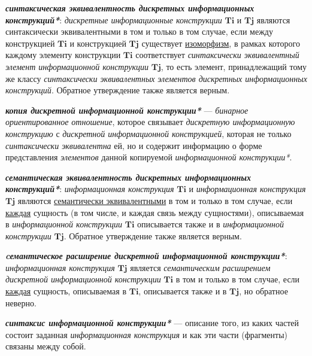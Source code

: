 \textit{\textbf{синтаксическая эквивалентность дискретных информационных конструкций*}}: \textit{дискретные информационные конструкции} $\bm{Ti}$ и $\bm{Tj}$ являются синтаксически эквивалентными в том и только в том случае, если между конструкцией \textit{$\bm{Ti}$} и конструкцией \textit{$\bm{Tj}$} существует \underline{изоморфизм}, в рамках которого каждому элементу конструкции \textit{$\bm{Ti}$} соответствует \textit{синтаксически эквивалентный элемент информационной конструкции} \textit{$\bm{Tj}$}, то есть элемент, принадлежащий тому же классу \textit{синтаксически эквивалентных} \textit{элементов дискретных информационных конструкций}.
Обратное утверждение также является верным.

\textit{\textbf{копия дискретной информационной конструкции*}} --- \textit{бинарное ориентированное отношение}, которое связывает \textit{дискретную информационную конструкцию} с \textit{дискретной информационной конструкцией}, которая не только \textit{синтаксически эквивалентна} ей, но и содержит информацию о форме представления \textit{элементов} данной копируемой \textit{информационной конструкции*}.

\begin{SCn}
\end{SCn}

\textit{\textbf{семантическая эквивалентность дискретных информационных конструкций*}}: \textit{информационная конструкция} \textit{$\bm{Ti}$} и \textit{информационная конструкция} \textit{$\bm{Tj}$} являются \underline{семантически эквивалентными} в том и только в том случае, если \underline{каждая} сущность (в том числе, и каждая связь между сущностями), описываемая в \textit{информационной конструкции} \textit{$\bm{Ti}$} описывается также и в \textit{информационной конструкции} \textit{$\bm{Tj}$}.
Обратное утверждение также является верным.

\textit{\textbf{cемантическое расширение дискретной информационной конструкции*}}: \textit{информационная конструкция} \textit{$\bm{Tj}$} является \textit{семантическим расширением дискретной информационной конструкции} \textit{$\bm{Ti}$} в том и только в том случае, если \underline{каждая} сущность, описываемая в \textit{$\bm{Ti}$}, описывается также и в \textit{$\bm{Tj}$}, но обратное неверно.

\textit{\textbf{синтаксис информационной конструкции*}} --- описание того, из каких частей состоит заданная \textit{информационная конструкция} и как эти части (фрагменты) связаны между собой.

